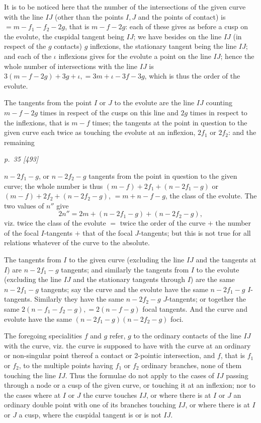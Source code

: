﻿\documentclass[11pt,a4paper]{article}
\theoremstyle{plain}
\theoremstyle{definition}
\begin{document}
It is to be noticed here that the number of the intersections of the given
curve with the line \(IJ\) (other than the points \(I,J\) and the points of
contact) is \(=m-f_1-f_2-2g\), that is \(m-f-2g\): each of these gives as
before a cusp on the evolute, the cuspidal tangent being \(IJ\); we have
besides on the line \(IJ\) (in respect of the \(g\) contacts) \(g\)
inflexions, the stationary tangent being the line \(IJ\); and each of the
\(\iota\) inflexions gives for the evolute a point on the line \(IJ\);
hence the whole number of intersections with the line \(IJ\) is
\(3(m-f-2g)+3g+\iota,=3m+\iota-3f-3g\), which is thus the order of the
evolute.

The tangents from the point \(I\) or \(J\) to the evolute are the line
\(IJ\) counting \(m-f-2g\) times in respect of the cusps on this line and
\(2g\) times in respect to the inflexions, that is \(m-f\) times; the
tangents at the point in question to the given curve each twice as touching
the evolute at an inflexion, \(2f_1\) or \(2f_2\): and the remaining

\clearpage
\textit{p.~35 [493]}

\(n-2f_1-g\), or \(n-2f_2-g\) tangents from the point in question to the
given curve; the whole number is thus
\((m-f)+2f_1+(n-2f_1-g)\) or \((m-f)+2f_2+(n-2f_2-g)\), \(=m+n-f-g\), the
class of the evolute. The two values of \(n''\) give
\[
2n''=2m+(n-2f_1-g)+(n-2f_2-g),
\]
viz. twice the class of the evolute \(=\) twice the order of the curve
\(+\) the number of the focal \(I\)-tangents \(+\) that of the focal
\(J\)-tangents; but this is not true for all relations whatever of the
curve to the absolute.

The tangents from \(I\) to the given curve (excluding the line \(IJ\) and
the tangents at \(I\)) are \(n-2f_1-g\) tangents; and similarly the
tangents from \(I\) to the evolute (excluding the line \(IJ\) and the
stationary tangents through \(I\)) are the same \(n-2f_1-g\) tangents; say
the curve and the evolute have the same \(n-2f_1-g\) \(I\)-tangents.
Similarly they have the same \(n-2f_2-g\) \(J\)-tangents; or together the
same \(2(n-f_1-f_2-g),=2(n-f-g)\) focal tangents. And the curve and evolute
have the same \((n-2f_1-g)(n-2f_2-g)\) foci.

The foregoing specialities \(f\) and \(g\) refer, \(g\) to the ordinary
contacts of the line \(IJ\) with the curve, viz. the curve is supposed to
have with the curve at an ordinary or non-singular point thereof a contact
or 2-pointic intersection, and \(f\), that is \(f_1\) or \(f_2\), to the
multiple points having \(f_1\) or \(f_2\) ordinary branches, none of them
touching the line \(IJ\). Thus the formulae do not apply to the cases of
\(IJ\) passing through a node or a cusp of the given curve, or touching it
at an inflexion; nor to the cases where at \(I\) or \(J\) the curve touches
\(IJ\), or where there is at \(I\) or \(J\) an ordinary double point with
one of its branches touching \(IJ\), or where there is at \(I\) or \(J\) a
cusp, where the cuspidal tangent is or is not \(IJ\).
\end{document}
